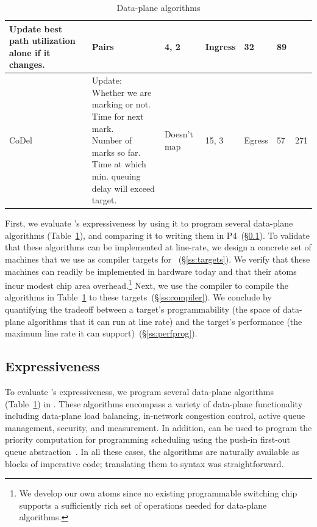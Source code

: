 \begin{table}[!t]
\begin{tabular}{|p{}|p{}|p{}|p{}|p{}|p{}|p{}|}
{                                           Update best path utilization alone if it changes.}  & Pairs & 4, 2 & Ingress & 32 & 89\\
\hline
CoDel~\cite{codel} & \pbox{0.37\textwidth}{Update:\\Whether we are marking or not.\\Time for next mark.\\Number of marks so far.\\Time at which min. queuing delay will exceed target.}& Doesn't map & 15, 3 & Egress & 57 & 271\\
\hline
\end{tabular}
\caption{Data-plane algorithms}
\label{tab:algos}
\end{table}

First, we evaluate \pktlanguage's expressiveness by using it to program several
data-plane algorithms (Table~\ref{tab:algos}), and comparing it to writing them
in P4~(\S\ref{ss:expressiveness}).  To validate that these algorithms can be
implemented at line-rate, we design a concrete set of \absmachine machines that
we use as compiler targets for \pktlanguage~(\S\ref{ss:targets}).  We verify
that these machines can readily be implemented in hardware today and that their
atoms incur modest chip area overhead.\footnote{We develop our own atoms since
no existing programmable switching chip supports a sufficiently rich set of
operations needed for data-plane algorithms.} Next, we use the \pktlanguage
compiler to compile the algorithms in Table~\ref{tab:algos} to these
targets~(\S\ref{ss:compiler}).  We conclude by quantifying the tradeoff between
a target's programmability (the space of data-plane algorithms that it can run
at line rate) and the target's performance (the maximum line rate it can
support)~(\S\ref{ss:perfprog}).

\subsection{Expressiveness}
\label{ss:expressiveness}

To evaluate \pktlanguage's expressiveness, we program several data-plane
algorithms (Table~\ref{tab:algos}) in \pktlanguage. These algorithms encompass
a variety of data-plane functionality including data-plane load balancing,
in-network congestion control, active queue management, security, and
measurement. In addition, \pktlanguage can be used to program the priority
computation for programming scheduling using the push-in first-out queue
abstraction~\cite{pifo_hotnets}. In all these cases, the algorithms are
naturally available as blocks of imperative code; translating them to
\pktlanguage syntax was straightforward.

